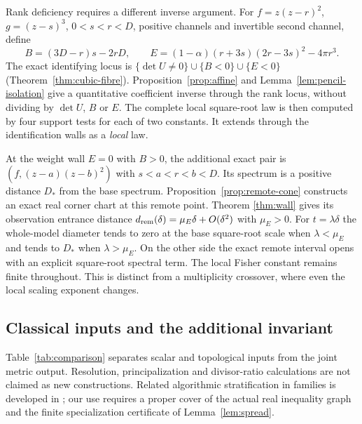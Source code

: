 Rank deficiency requires a different inverse argument. For
$f=z(z-r)^2$, $g=(z-s)^3$, $0<s<r<D$, positive channels and invertible
second channel, define
\[
 B=(3D-r)s-2rD,\qquad
 E=(1-\alpha)(r+3s)(2r-3s)^2-4\pi r^3.
\]
The exact identifying locus is
$\{\det U\ne0\}\cup\{B<0\}\cup\{E<0\}$
(Theorem~\ref{thm:cubic-fibre}). Proposition~\ref{prop:affine} and
Lemma~\ref{lem:pencil-isolation} give a quantitative coefficient inverse
through the rank locus, without dividing by $\det U$, $B$ or $E$.
The complete local square-root law is then computed by four support
tests for each of two constants. It extends through the identification
walls as a \emph{local} law.

At the weight wall $E=0$ with $B>0$, the additional exact pair is
$(f,(z-a)(z-b)^2)$ with $s<a<r<b<D$. Its spectrum is a positive
distance $D_*$ from the base spectrum. Proposition~\ref{prop:remote-cone}
constructs an exact real corner chart at this remote point. Theorem
\ref{thm:wall} gives its observation entrance distance
$d_{\rm rem}(\delta)=\mu_E\delta+O(\delta^2)$ with $\mu_E>0$.
For $t=\lambda\delta$ the whole-model diameter tends to zero at the
base square-root scale when $\lambda<\mu_E$ and tends to $D_*$ when
$\lambda>\mu_E$. On the other side the exact remote interval opens
with an explicit square-root spectral term. The local Fisher constant
remains finite throughout. This is distinct from a multiplicity crossover,
where even the local scaling exponent changes.

\subsection*{Classical inputs and the additional invariant}
Table~\ref{tab:comparison} separates scalar and topological inputs from
the joint metric output. Resolution, principalization and divisor-ratio
calculations are not claimed as new constructions. Related algorithmic
stratification in families is developed in \cite{ENV03}; our use requires
a proper cover of the actual real inequality graph and the finite
specialization certificate of Lemma~\ref{lem:spread}.

